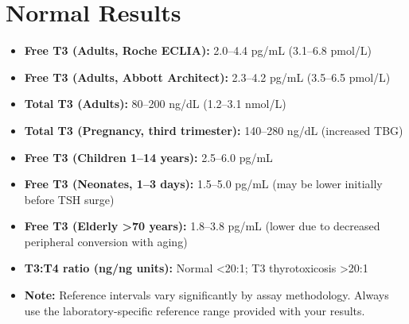 \section*{Normal Results}
\begin{itemize}
  \item \textbf{Free T3 (Adults, Roche ECLIA):} 2.0--4.4 pg/mL (3.1--6.8 pmol/L)
  \item \textbf{Free T3 (Adults, Abbott Architect):} 2.3--4.2 pg/mL (3.5--6.5 pmol/L)
  \item \textbf{Total T3 (Adults):} 80--200 ng/dL (1.2--3.1 nmol/L)
  \item \textbf{Total T3 (Pregnancy, third trimester):} 140--280 ng/dL (increased TBG)
  \item \textbf{Free T3 (Children 1--14 years):} 2.5--6.0 pg/mL
  \item \textbf{Free T3 (Neonates, 1--3 days):} 1.5--5.0 pg/mL (may be lower initially before TSH surge)
  \item \textbf{Free T3 (Elderly >70 years):} 1.8--3.8 pg/mL (lower due to decreased peripheral conversion with aging)
  \item \textbf{T3:T4 ratio (ng/ng units):} Normal <20:1; T3 thyrotoxicosis >20:1
  \item \textbf{Note:} Reference intervals vary significantly by assay methodology. Always use the laboratory-specific reference range provided with your results.
\end{itemize}

